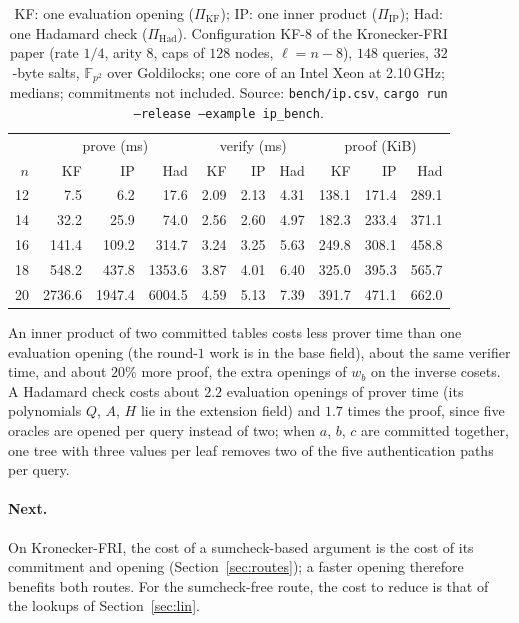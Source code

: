 \documentclass[11pt]{article}
\theoremstyle{definition}
\newcommand{\F}{\mathbb{F}}
\begin{document}
\begin{table}[h]
\centering\small
\setlength{\tabcolsep}{4pt}
\begin{tabular}{r rrr rrr rrr}
\hline
& \multicolumn{3}{c}{prove (ms)} & \multicolumn{3}{c}{verify (ms)} & \multicolumn{3}{c}{proof (KiB)}\\
$n$ & KF & IP & Had & KF & IP & Had & KF & IP & Had\\
\hline
12 & 7.5 & 6.2 & 17.6 & 2.09 & 2.13 & 4.31 & 138.1 & 171.4 & 289.1\\
14 & 32.2 & 25.9 & 74.0 & 2.56 & 2.60 & 4.97 & 182.3 & 233.4 & 371.1\\
16 & 141.4 & 109.2 & 314.7 & 3.24 & 3.25 & 5.63 & 249.8 & 308.1 & 458.8\\
18 & 548.2 & 437.8 & 1353.6 & 3.87 & 4.01 & 6.40 & 325.0 & 395.3 & 565.7\\
20 & 2736.6 & 1947.4 & 6004.5 & 4.59 & 5.13 & 7.39 & 391.7 & 471.1 & 662.0\\
\hline
\end{tabular}
\caption{\label{tab:ip}KF: one evaluation opening ($\Pi_{\mathrm{KF}}$); IP: one inner product ($\Pi_{\mathrm{IP}}$); Had: one Hadamard check ($\Pi_{\mathrm{Had}}$). Configuration KF-8 of the Kronecker-FRI paper (rate $1/4$, arity $8$, caps of $128$ nodes, $\ell=n-8$), $148$ queries, $32$-byte salts, $\F_{p^2}$ over Goldilocks; one core of an Intel Xeon at 2.10\,GHz; medians; commitments not included. Source: \texttt{bench/ip.csv}, \texttt{cargo run --release --example ip\_bench}.}
\end{table}
An inner product of two committed tables costs less prover time than one evaluation opening (the round-$1$ work is in the base field), about the same verifier time, and about $20\%$ more proof, the extra openings of $w_b$ on the inverse cosets.
A Hadamard check costs about $2.2$ evaluation openings of prover time (its polynomials $Q$, $A$, $H$ lie in the extension field) and $1.7$ times the proof, since five oracles are opened per query instead of two; when $a$, $b$, $c$ are committed together, one tree with three values per leaf removes two of the five authentication paths per query.

\paragraph{Next.} On Kronecker-FRI, the cost of a sumcheck-based argument is the cost of its commitment and opening (Section~\ref{sec:routes}); a faster opening therefore benefits both routes. For the sumcheck-free route, the cost to reduce is that of the lookups of Section~\ref{sec:lin}.
\end{document}
